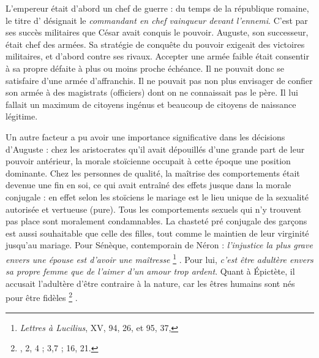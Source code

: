  L'empereur était d'abord un chef de guerre : du temps de la république romaine, le titre d' désignait le {\emph{commandant en chef vainqueur devant l'ennemi}}. C'est par ses succès militaires que César avait conquis le pouvoir. Auguste, son successeur, était chef des armées. Sa stratégie de conquête du pouvoir exigeait des victoires militaires, et d'abord contre ses rivaux. Accepter une armée faible était consentir à sa propre défaite à plus ou moins proche échéance. Il ne pouvait donc se satisfaire d'une armée d'affranchis. Il ne pouvait pas non plus envisager de confier son armée à des magistrats (officiers) dont on ne connaissait pas le père. Il lui fallait un maximum de citoyens ingénus et beaucoup de citoyens de naissance légitime. 

 Un autre facteur a pu avoir une importance significative dans les décisions d'Auguste : chez les aristocrates qu'il avait dépouillés d'une grande part de leur pouvoir antérieur, la morale stoïcienne occupait à cette époque une position dominante. Chez les personnes de qualité, la maîtrise des comportements était devenue une fin en soi, ce qui avait entraîné des effets jusque dans la morale conjugale : en effet selon les stoïciens le mariage est le lieu unique de la sexualité autorisée et vertueuse (pure). Tous les comportements sexuels qui n'y trouvent pas place sont moralement condamnables. La chasteté pré conjugale des garçons est aussi souhaitable que celle des filles, tout comme le maintien de leur virginité jusqu'au mariage. Pour Sénèque, contemporain de Néron : {\emph{l'injustice la plus grave envers une épouse est d'avoir une maîtresse}%
\footnote{\emph{Lettres à Lucilius}, XV, 94, 26, et 95, 37, }%
}. Pour lui, {\emph{c'est être adultère envers sa propre femme que de l'aimer d'un amour trop ardent}}. Quant à Épictète, il accusait l'adultère d'être contraire à la nature, car les êtres humains sont nés pour être fidèles%
\footnote{, 2, 4 ; 3,7 ; 16, 21.}%
. 


